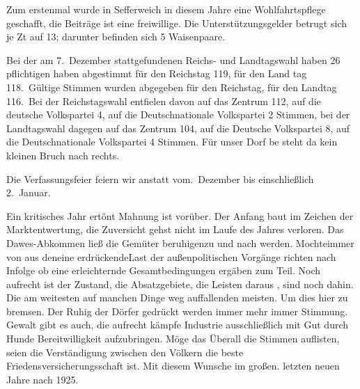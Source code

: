 

Zum erstenmal wurde in Sefferweich in diesem Jahre eine\ob
Wohlfahrtspflege geschafft, die Beiträge ist eine freiwillige.\ob
Die Unterstützungsgelder betrugt sich je Zt auf 13; darunter befinden\ob
sich 5 Waisenpaare.

Bei der am 7.\ Dezember stattgefundenen Reichs- und\ob
Landtagswahl haben 26%
pflichtigen haben abgestimmt für den Reichstag 119, für den Land\ohb
tag 118.\ Gültige Stimmen wurden abgegeben für den Reichstag, für den Landtag 116.\ Bei der Reichstagswahl entfielen davon\ob
auf das Zentrum 112, auf die deutsche Volkspartei 4, auf die\ob
Deutschnationale Volkspartei 2 Stimmen, bei der Landtagswahl\ob
dagegen auf das Zentrum 104, auf die Deutsche Volkspartei 8,\ob
auf die Deutschnationale Volkspartei 4 Stimmen. Für unser Dorf be\ohb
steht da kein kleinen Bruch nach rechts.

Die Verfassungsfeier feiern wir anstatt vom.\ Dezember bis einschließlich 2.\ Januar.



Ein kritisches Jahr ertönt Mahnung ist vorüber. Der Anfang\ob
baut im Zeichen der Marktentwertung, die Zuversicht gehst\unsicher{} nicht\ob
im Laufe des Jahres verloren. Das Dawes-Abkommen ließ die\ob
Gemüter beruhigen\unsicher zu und nach werden. Mochte\unsicher immer von aus\ob
den\unsicher eine erdrückende\unsicher Last der außenpolitischen Vorgänge richten\ob
nach Infolge ob eine erleichternde   Gesamtbedingungen ergäben\ob
zum Teil. Noch aufrecht ist der Zustand, die Absatzgebiete, die Leisten\ob
daraus\unsicher{} , sind noch dahin. Die am weitesten auf manchen Dinge\ob
weg auffallenden meisten. Um dies hier zu bremsen. Der Ruhig der\ob
Dörfer gedrückt werden immer mehr     immer  Stimmung. Gewalt gibt\ob
es auch, die aufrecht kämpfe Industrie ausschließlich mit Gut durch\ob
Hunde Bereitwilligkeit aufzubringen. Möge das Überall die Stimmen\ob
auflisten, seien die Verständigung zwischen den Völkern die beste\ob
Friedensversicherungsschaft ist. Mit diesem Wunsche im großen. letzten neuen\ob
Jahre nach 1925.
\pend
